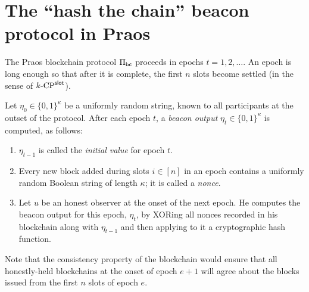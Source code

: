 \section{The ``hash the chain'' beacon protocol in Praos}\label{sec:praos-beacon-def}
The Praos blockchain protocol $\Pi_\mathsf{bc}$ 
proceeds in epochs $t = 1, 2, \ldots$. 
An epoch is long enough 
so that after it is complete, 
the first $n$ slots become settled 
(in the sense of ${k}\text{-}\mathrm{CP}^{\mathsf{slot}}$).


\begin{definition}\label{def:praos-beacon}
  Let $\eta_0 \in \{0,1\}^\kappa$ be a uniformly random string, known to all participants 
  at the outset of the protocol.
  After each epoch $t$, 
  a \emph{beacon output} $\eta_t \in \{0,1\}^\kappa$ is computed, as follows: 
  \begin{enumerate}
    \item $\eta_{t-1}$ is called the \emph{initial value} for epoch $t$.

    \item Every new block added during slots $i \in [n]$ in an epoch contains 
    a uniformly random Boolean string of length $\kappa$; 
    it is called a \emph{nonce}.

    \item Let $u$ be an honest observer at the onset of the next epoch. 
    He computes the beacon output for this epoch, $\eta_t$, 
    by XORing all nonces recorded in his blockchain 
    along with $\eta_{t-1}$ 
    and then applying to it a cryptographic hash function.
  \end{enumerate}
  Note that the consistency property of the blockchain 
  would ensure that all honestly-held blockchains 
  at the onset of epoch $e + 1$ 
  will agree about the blocks issued from 
  the first $n$ slots of epoch $e$.  
\end{definition}






